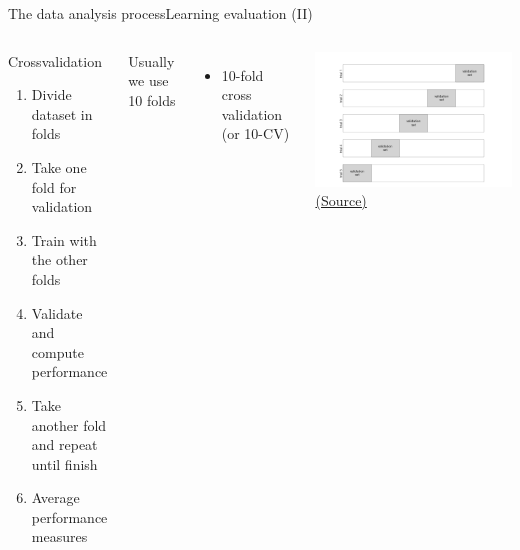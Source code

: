 \documentclass[10pt,compress]{beamer} %
\begin{document}
\begin{frame}{The data analysis process}{Learning evaluation (II)}
	\begin{columns}
		\begin{block}{Crossvalidation}
			\begin{enumerate}
			\item Divide dataset in folds
			\item Take one fold for validation
			\item Train with the other folds
			\item Validate and compute performance
			\item Take another fold and repeat until finish
			\item Average performance measures
		\end{enumerate}
		\end{block}
		Usually we use 10 folds 
		\begin{itemize}
			\item 10-fold cross validation (or 10-CV)
		\end{itemize}

		\begin{center}
		\includegraphics[width=\linewidth]{figs/05.03-5-fold-CV.png}\\
    	\tiny{\href{https://jakevdp.github.io/PythonDataScienceHandbook/05.03-hyperparameters-and-model-validation.html}{(Source)}}
		\end{center}
	\end{columns}
\end{frame}
\end{document}

